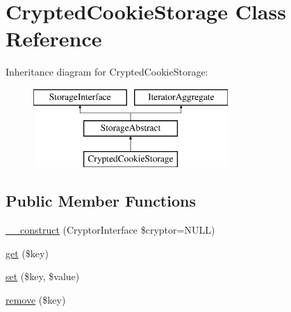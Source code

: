\hypertarget{class_pes_1_1_storage_1_1_crypted_cookie_storage}{}\section{Crypted\+Cookie\+Storage Class Reference}
\label{class_pes_1_1_storage_1_1_crypted_cookie_storage}
Inheritance diagram for Crypted\+Cookie\+Storage\+:\begin{figure}[H]
\begin{center}
\leavevmode
\includegraphics[height=3.000000cm]{class_pes_1_1_storage_1_1_crypted_cookie_storage}
\end{center}
\end{figure}
\subsection*{Public Member Functions}
\begin{DoxyCompactItemize}
\item 
\mbox{\hyperlink{class_pes_1_1_storage_1_1_crypted_cookie_storage_a50813cabae3d1f02d70183d18e653923}{\+\_\+\+\_\+construct}} (Cryptor\+Interface \$cryptor=N\+U\+LL)
\item 
\mbox{\hyperlink{class_pes_1_1_storage_1_1_crypted_cookie_storage_a24a9bf83a1002d46ece83a93d14bd921}{get}} (\$key)
\item 
\mbox{\hyperlink{class_pes_1_1_storage_1_1_crypted_cookie_storage_aab787bd83f84f4215dceb35f7c305eee}{set}} (\$key, \$value)
\item 
\mbox{\hyperlink{class_pes_1_1_storage_1_1_crypted_cookie_storage_a95483af4e2c07dc9893fe058b026bd5d}{remove}} (\$key)
\end{DoxyCompactItemize}
